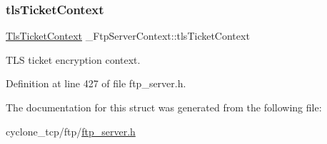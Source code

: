 \subsubsection{\texorpdfstring{tls\+Ticket\+Context}{tlsTicketContext}}
{\footnotesize\ttfamily \hyperlink{structTlsTicketContext}{Tls\+Ticket\+Context} \+\_\+\+Ftp\+Server\+Context\+::tls\+Ticket\+Context}



T\+LS ticket encryption context. 



Definition at line 427 of file ftp\+\_\+server.\+h.



The documentation for this struct was generated from the following file\+:\begin{DoxyCompactItemize}
\item 
cyclone\+\_\+tcp/ftp/\hyperlink{ftp__server_8h}{ftp\+\_\+server.\+h}\end{DoxyCompactItemize}
